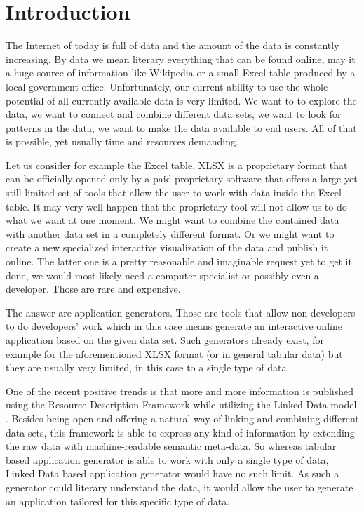 \chapter*{Introduction}

The Internet of today is full of data and the amount of the data is constantly increasing. By data we mean literary everything that can be found online, may it a huge source of information like Wikipedia or a small Excel table produced by a local government office. Unfortunately, our current ability to use the whole potential of all currently available data is very limited. We want to to explore the data, we want to connect and combine different data sets, we want to look for patterns in the data, we want to make the data available to end users. All of that is possible, yet usually time and resources demanding. 

Let us consider for example the Excel table.  XLSX is a proprietary format that can be officially opened only by a paid proprietary software that offers a large yet still limited set of tools that allow the user to work with data inside the Excel table. It may very well happen that the proprietary tool will not allow us to do what we want at one moment. We might want to combine the contained data with another data set in a completely different format. Or we might want to create a new specialized interactive visualization of the data and publish it online. The latter one is  a pretty reasonable and imaginable request yet to get it done, we would most likely need a computer specialist or possibly even a developer. Those are rare and expensive.

The answer are application generators. Those are tools that allow non-developers to do developers' work which in this case means generate an interactive online application based on the given data set. Such generators already exist, for example for the aforementioned XLSX format (or in general tabular data) but they are usually very limited, in this case to a single type of data.

One of the recent positive trends is that more and more information is published using the Resource Description Framework \cite{rdf} while utilizing the Linked Data model \cite{ld}. Besides being open and offering a natural way of linking and combining different data sets, this framework is able to express any kind of information by extending the raw data with machine-readable semantic meta-data. So whereas tabular based application generator is able to work with only a single type of data, Linked Data based application generator would have no such limit. As such a generator could literary understand the data, it would allow the user to generate an application tailored for this specific type of data.


